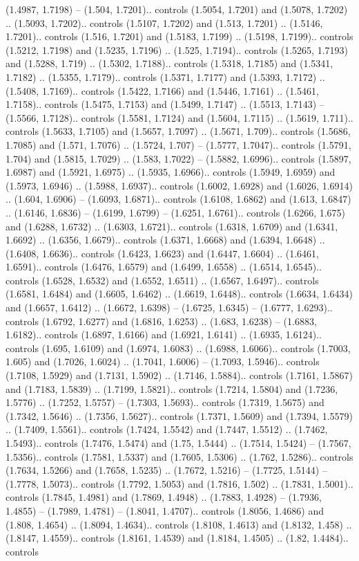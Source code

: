 (1.4987, 1.7198) -- (1.504, 1.7201).. controls (1.5054, 1.7201) and (1.5078, 1.7202) .. (1.5093, 1.7202).. controls (1.5107, 1.7202) and (1.513, 1.7201) .. (1.5146, 1.7201).. controls (1.516, 1.7201) and (1.5183, 1.7199) .. (1.5198, 1.7199).. controls (1.5212, 1.7198) and (1.5235, 1.7196) .. (1.525, 1.7194).. controls (1.5265, 1.7193) and (1.5288, 1.719) .. (1.5302, 1.7188).. controls (1.5318, 1.7185) and (1.5341, 1.7182) .. (1.5355, 1.7179).. controls (1.5371, 1.7177) and (1.5393, 1.7172) .. (1.5408, 1.7169).. controls (1.5422, 1.7166) and (1.5446, 1.7161) .. (1.5461, 1.7158).. controls (1.5475, 1.7153) and (1.5499, 1.7147) .. (1.5513, 1.7143) -- (1.5566, 1.7128).. controls (1.5581, 1.7124) and (1.5604, 1.7115) .. (1.5619, 1.711).. controls (1.5633, 1.7105) and (1.5657, 1.7097) .. (1.5671, 1.709).. controls (1.5686, 1.7085) and (1.571, 1.7076) .. (1.5724, 1.707) -- (1.5777, 1.7047).. controls (1.5791, 1.704) and (1.5815, 1.7029) .. (1.583, 1.7022) -- (1.5882, 1.6996).. controls (1.5897, 1.6987) and (1.5921, 1.6975) .. (1.5935, 1.6966).. controls (1.5949, 1.6959) and (1.5973, 1.6946) .. (1.5988, 1.6937).. controls (1.6002, 1.6928) and (1.6026, 1.6914) .. (1.604, 1.6906) -- (1.6093, 1.6871).. controls (1.6108, 1.6862) and (1.613, 1.6847) .. (1.6146, 1.6836) -- (1.6199, 1.6799) -- (1.6251, 1.6761).. controls (1.6266, 1.675) and (1.6288, 1.6732) .. (1.6303, 1.6721).. controls (1.6318, 1.6709) and (1.6341, 1.6692) .. (1.6356, 1.6679).. controls (1.6371, 1.6668) and (1.6394, 1.6648) .. (1.6408, 1.6636).. controls (1.6423, 1.6623) and (1.6447, 1.6604) .. (1.6461, 1.6591).. controls (1.6476, 1.6579) and (1.6499, 1.6558) .. (1.6514, 1.6545).. controls (1.6528, 1.6532) and (1.6552, 1.6511) .. (1.6567, 1.6497).. controls (1.6581, 1.6484) and (1.6605, 1.6462) .. (1.6619, 1.6448).. controls (1.6634, 1.6434) and (1.6657, 1.6412) .. (1.6672, 1.6398) -- (1.6725, 1.6345) -- (1.6777, 1.6293).. controls (1.6792, 1.6277) and (1.6816, 1.6253) .. (1.683, 1.6238) -- (1.6883, 1.6182).. controls (1.6897, 1.6166) and (1.6921, 1.6141) .. (1.6935, 1.6124).. controls (1.695, 1.6109) and (1.6974, 1.6083) .. (1.6988, 1.6066).. controls (1.7003, 1.605) and (1.7026, 1.6024) .. (1.7041, 1.6006) -- (1.7093, 1.5946).. controls (1.7108, 1.5929) and (1.7131, 1.5902) .. (1.7146, 1.5884).. controls (1.7161, 1.5867) and (1.7183, 1.5839) .. (1.7199, 1.5821).. controls (1.7214, 1.5804) and (1.7236, 1.5776) .. (1.7252, 1.5757) -- (1.7303, 1.5693).. controls (1.7319, 1.5675) and (1.7342, 1.5646) .. (1.7356, 1.5627).. controls (1.7371, 1.5609) and (1.7394, 1.5579) .. (1.7409, 1.5561).. controls (1.7424, 1.5542) and (1.7447, 1.5512) .. (1.7462, 1.5493).. controls (1.7476, 1.5474) and (1.75, 1.5444) .. (1.7514, 1.5424) -- (1.7567, 1.5356).. controls (1.7581, 1.5337) and (1.7605, 1.5306) .. (1.762, 1.5286).. controls (1.7634, 1.5266) and (1.7658, 1.5235) .. (1.7672, 1.5216) -- (1.7725, 1.5144) -- (1.7778, 1.5073).. controls (1.7792, 1.5053) and (1.7816, 1.502) .. (1.7831, 1.5001).. controls (1.7845, 1.4981) and (1.7869, 1.4948) .. (1.7883, 1.4928) -- (1.7936, 1.4855) -- (1.7989, 1.4781) -- (1.8041, 1.4707).. controls (1.8056, 1.4686) and (1.808, 1.4654) .. (1.8094, 1.4634).. controls (1.8108, 1.4613) and (1.8132, 1.458) .. (1.8147, 1.4559).. controls (1.8161, 1.4539) and (1.8184, 1.4505) .. (1.82, 1.4484).. controls 
